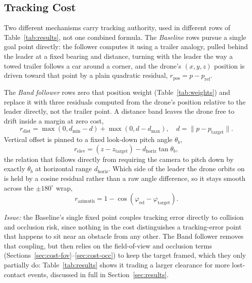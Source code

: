 \documentclass[conference]{IEEEtran}
\begin{document}
\subsection{Tracking Cost}
\label{sec:cost-track}

Two different mechanisms carry tracking authority, used in different rows of Table~\ref{tab:results}, not one combined formula. The \emph{Baseline} rows pursue a single goal point directly: the follower computes it using a trailer analogy, pulled behind the leader at a fixed bearing and distance, turning with the leader the way a towed trailer follows a car around a corner, and the drone's $(x,y,z)$ position is driven toward that point by a plain quadratic residual, $r_{\text{pos}} = p - p_{\text{ref}}$.

The \emph{Band follower} rows zero that position weight (Table~\ref{tab:weights}) and replace it with three residuals computed from the drone's position relative to the leader directly, not the trailer point. A distance band leaves the drone free to drift inside a margin at zero cost,
\begin{equation}
r_{\text{dist}} = \max(0, d_{\min}-d) + \max(0, d-d_{\max}), \quad d = \lVert p - p_{\text{target}} \rVert.
\end{equation}
Vertical offset is pinned to a fixed look-down pitch angle $\theta_b$,
\begin{equation}
r_{\text{elev}} = (z - z_{\text{target}}) - d_{\text{horiz}}\tan\theta_b,
\end{equation}
the relation that follows directly from requiring the camera to pitch down by exactly $\theta_b$ at horizontal range $d_{\text{horiz}}$. Which side of the leader the drone orbits on is held by a cosine residual rather than a raw angle difference, so it stays smooth across the $\pm180^\circ$ wrap,
\begin{equation}
r_{\text{azimuth}} = 1-\cos(\varphi_{\text{rel}}-\varphi_{\text{target}}).
\end{equation}

\emph{Issue:} the Baseline's single fixed point couples tracking error directly to collision and occlusion risk, since nothing in the cost distinguishes a tracking-error point that happens to sit near an obstacle from any other. The Band follower removes that coupling, but then relies on the field-of-view and occlusion terms (Sections~\ref{sec:cost-fov}--\ref{sec:cost-occ}) to keep the target framed, which they only partially do: Table~\ref{tab:results} shows it trading a larger clearance for more lost-contact events, discussed in full in Section~\ref{sec:results}.
\end{document}
